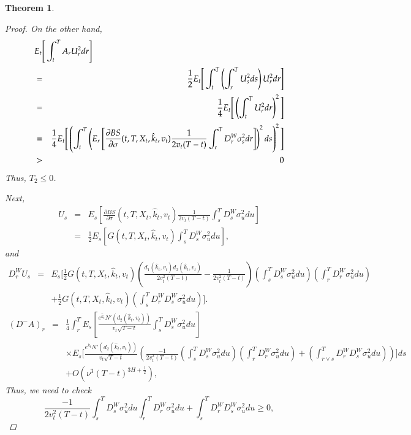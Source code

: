 \documentclass[11pt]{article}
\newtheorem{theorem}{Theorem}
\begin{document}
\begin{theorem}
\begin{proof}
On the other hand, 
\begin{eqnarray}
\lefteqn{E_t\Bigg[\int_{t}^{T} A_r U_r^2 dr \Bigg]}\nonumber\\
&=&\frac{1}{2}E_t\Bigg[\int_{t}^{T} \left(\int_r^TU_s^2ds\right) U_r^2 dr \Bigg]\nonumber\\
&=&\frac{1}{4}E_t\Bigg[ \left(\int_t^TU_r^2dr\right)^2  \Bigg]\nonumber\\
&=&\frac{1}{4}E_t\Bigg[ \left(\int_t^T\left(    E_r\left[\frac{\partial BS}{\partial \sigma}(t,T,X_t,\hat{k}_t,v_t)\frac{1}{2v_t(T-t)}\int_r^TD_r^W\sigma_s^2 dr\right]
    \right)^2ds\right)^2  \Bigg]\nonumber\\
&>& 0
\end{eqnarray}
Thus, $T_2\le 0$.

Next,
\begin{eqnarray}
\label{U}
U_s&=&E_s\left[\frac{\partial BS}{\partial \sigma}(t,T,X_t,\hat{k}_t,v_t)\frac{1}{2v_t(T-t)}\int_s^T D_s^W \sigma_u^2 du\right]  \nonumber\\
&=&\frac12    E_s\left[G(t,T,X_t,\hat{k}_t,v_t)\int_s^T D_s^W \sigma_u^2 du\right],
\end{eqnarray}
and
\begin{eqnarray}
\label{DU}
D_r^WU_s&=& E_s\Bigg[ \frac12 
G(t,T,X_t,\hat{k}_t,v_t)\left(\frac{d_1(\hat{k}_t,v_t)d_2(\hat{k}_t,v_t)}{2v_t^2(T-t)} - \frac{1}{2v_t^2(T-t)}\right)
\left(\int_s^T D_s^W\sigma_u^2 du\right)\left(\int_r^TD_r^W\sigma_u^2 du\right)
\nonumber\\
&&+\frac12G(t,T,X_t,\hat{k}_t,v_t)\left(\int_s^TD_r^WD_s^W\sigma_u^2 du\right)\Bigg].
\end{eqnarray}
\begin{eqnarray}
\label{DA2}
(D^-A)_r
&=&
\frac{1}{4}
\int_r^T E_s\left[\frac{e^{\hat{k}_t}N'(d_2(\hat{k}_t,v_t))}{v_t\sqrt{T-t}}\int_s^TD_s^W\sigma_u^2 du    \right] \nonumber\\
&&\times E_s \Bigg[
\frac{e^{\hat{k}_t}N'(d_2(\hat{k}_t,v_t))}{v_t\sqrt{T-t}}
\left(
\frac{-1}{2 v_t^2(T-t)}
\left(\int_s^TD_s^W\sigma_u^2 du\right)\left(\int_r^TD_r^W\sigma_u^2 du\right)+\left(\int_{r\vee s}^TD_r^WD_s^W\sigma_u^2 du\right)\right)
\Bigg] ds\nonumber\\
&&
+ O(\nu^3 (T-t)^{3H+\frac{1}{2}}),
\end{eqnarray}
Thus, we need to check
\begin{equation}
\frac{-1}{2 v_t^2(T-t)}\int_s^TD_s^W\sigma_u^2 du\int_r^TD_r^W\sigma_u^2 du+\int_s^TD_r^WD_s^W\sigma_u^2 du \ge 0,
\label{eq9}
\end{equation}

\end{proof}
\end{theorem}
\end{document}
